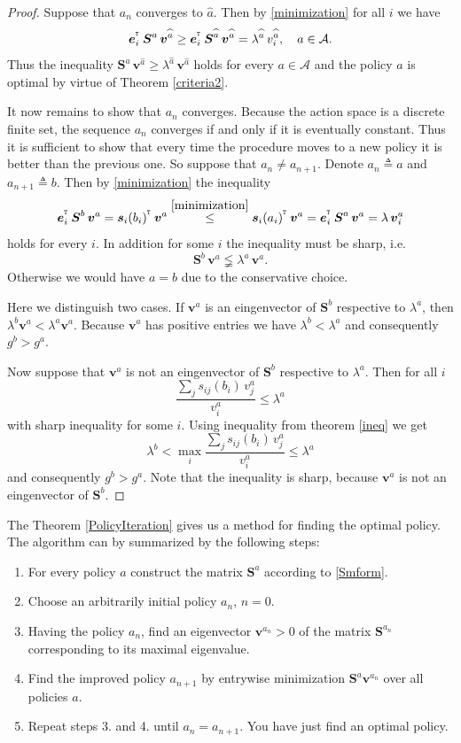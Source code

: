 \begin{proof}
Suppose that $a_n$ converges to $\widehat{a}$. Then by \eqref{minimization} for all $i$ we have
\[\mbox{\boldmath{$e$}}_i^{^{_\texttt T}}\,\mbox{\boldmath{$S$}}^a\,\mbox{\boldmath{$v$}}^{\widehat{a}}\geq \mbox{\boldmath{$e$}}_i^{^{_\texttt T}}\,\mbox{\boldmath{$S$}}^{\widehat{a}}\,\mbox{\boldmath{$v$}}^{\widehat{a}}=\lambda^{\widehat{a}}\,v_i^{\widehat{a}}, \quad a\in\mathcal{A}.\]
Thus the inequality $\bm{S}^a\,\bm{v}^{\widehat{a}}\geq\lambda^{\widehat{a}}\,\bm{v}^{\widehat{a}}$ holds for every $a\in\mathcal{A}$ and the policy $\widehat{a}$ is optimal by virtue of Theorem \ref{criteria2}.

It now remains to show that $a_n$ converges. Because the action space is a discrete finite set, the sequence $a_n$ converges if and only if it is eventually constant. Thus it is sufficient to show that every time the procedure moves to a new policy it is better than the previous one. So suppose that $a_n \neq a_{n+1}$. Denote $a_n\triangleq a$ and $a_{n+1}\triangleq b$. Then by \eqref{minimization} the inequality 
\[\mbox{\boldmath{$e$}}_i^{^{_\texttt T}}\,\mbox{\boldmath{$S$}}^b\,\mbox{\boldmath{$v$}}^a=\mbox{\boldmath{$s$}}_i(b_i)^{^{_\texttt T}}\,\mbox{\boldmath{$v$}}^a\overset{\eqref{minimization}}{\leq} \mbox{\boldmath{$s$}}_i(a_i)^{^{_\texttt T}}\,\mbox{\boldmath{$v$}}^a=\mbox{\boldmath{$e$}}_i^{^{_\texttt T}}\,\mbox{\boldmath{$S$}}^a\,\mbox{\boldmath{$v$}}^a=\lambda\,\mbox{\boldmath{$v$}}_i^a\]
holds for every $i$. In addition for some $i$ the inequality must be sharp, i.e.
\[\bm{S}^b\,\bm{v}^a \lneqq \lambda^a\,\bm{v}^a.\] 
Otherwise we would have $a=b$ due to the conservative choice. %

Here we distinguish two cases. If $\bm{v}^a$ is an eingenvector of $\bm{S}^b$ respective to $\lambda^a$, then $\lambda^b\bm{v}^a<\lambda^a\bm{v}^a$. Because $\bm{v}^a$ has positive entries we have $\lambda^b<\lambda^a$ and consequently $g^b>g^a$.

Now suppose that $\bm{v}^a$ is not an eingenvector of $\bm{S}^b$ respective to $\lambda^a$. Then for all $i$
$$\frac{\sum_j s_{ij}(b_i)\,v_j^a}{v_i^a}\leq\lambda^a$$
with sharp inequality for some $i$. Using inequality from theorem \ref{ineq} we get
$$\lambda^b<\max_i\frac{\sum_j s_{ij}(b_i)\,v_j^a}{v_i^a}\leq\lambda^a$$
and consequently $g^b>g^a$. Note that the inequality is sharp, because $\bm{v}^a$ is not an eingenvector of $\bm{S}^b$.
\end{proof}

The Theorem \ref{PolicyIteration} gives us a method for finding the optimal policy. The algorithm can by summarized by the following steps: 
\begin{enumerate}
\item For every policy $a$ construct the matrix $\bm{S}^{a}$ according to \eqref{Smform}.
\item Choose an arbitrarily initial policy $a_n$, $n=0$.
\item Having the policy $a_n$, find an eigenvector $\bm{v}^{a_n}>0$ of the matrix $\bm{S}^{a_n}$ corresponding to its maximal eigenvalue.
\item Find the improved policy $a_{n+1}$ by entrywise minimization $\bm{S}^{a}\bm{v}^{a_n}$ over all policies $a$.
\item Repeat steps 3. and 4. until $a_n=a_{n+1}$. You have just find an optimal policy.
\end{enumerate}

